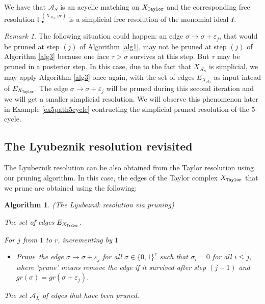 \documentclass[12pt]{amsart}
\newtheorem{algorithm}[theorem]{Algorithm}
\theoremstyle{definition}
\theoremstyle{remark}
\newtheorem{remark}[theorem]{Remark}
\numberwithin{equation}{section}
\newcommand{\cA}{{\mathcal A}}
\newcommand{\lra}{{\longrightarrow}}
\begin{document}
We have that $\cA_S$ is an acyclic matching on  $X_{\tt Taylor}$
and the corresponding free resolution
$\mathbb{F}_{\bullet}^{(X_{\cA_S},gr)}$ is a simplicial free
resolution of the monomial ideal $I$.

\begin{remark}\label{rkIterate}
The following situation could happen: an edge ${\sigma} \lra{\sigma + \varepsilon_j}$,
that would be pruned at step $(j)$ of Algorithm \ref{alg1}, may not be pruned at step $(j)$ of Algorithm \ref{alg3}
because one face $\tau > \sigma$ survives at this step. But $\tau$ may be
pruned in a posterior step. In this case,
due to the fact that $X_{\cA_S}$ is simplicial,
we may apply Algorithm \ref{alg3} once again, with the set of edges $E_{X_{\cA_S}}$ as input intead of $E_{X_{\tt Taylor}}$.
The edge ${\sigma} \lra{\sigma + \varepsilon_j}$ will be pruned during this second iteration
and we will get a smaller simplicial resolution.
We will observe this phenomenon later in Example \ref{ex5path5cycle}
contructing the simplicial pruned resolution of the 5-cycle.

\end{remark}


\subsection{The Lyubeznik resolution revisited}

The Lyubeznik resolution can be also obtained from the Taylor resolution using our pruning algorithm.
In this case, the edges of the Taylor complex  $X_{\tt Taylor}$ that we prune are obtained
using the following:

\begin{algorithm}\label{alg2} { (The Lyubeznik resolution via pruning)}

\vskip 2mm

{\rm {} The set of edges $E_{X_{\tt Taylor}}$.


\vskip 2mm



For $j$ from $1$ to $r$, incrementing by $1$

\vskip 2mm

\begin{itemize}

\item[\textbf{(j)}] ${\it Prune}$ the edge ${\sigma} \lra{\sigma + \varepsilon_j}$ for
all $\sigma \in \{0,1\}^r$ such that $\sigma_i=0$ for all $i\leq j$,
where `prune' means remove the edge if it survived after step $(j-1)$
and $gr(\sigma)=gr(\sigma + \varepsilon_j) $.

\end{itemize}}

\vskip 2mm


 The set $\cA_L$ of edges that have been pruned.
\end{algorithm}
\end{document}
